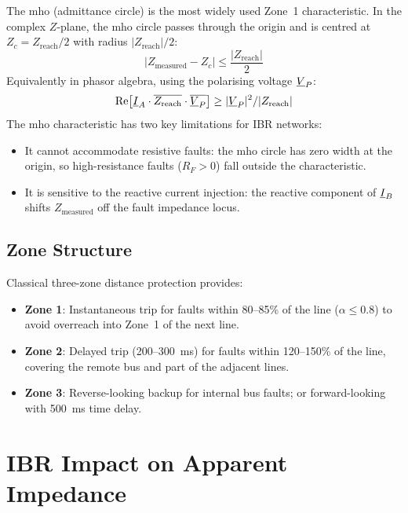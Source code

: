 The mho (admittance circle) is the most widely used Zone~1 characteristic.
In the complex $Z$-plane, the mho circle passes through the origin and
is centred at $Z_c = Z_\mathrm{reach}/2$ with radius $|Z_\mathrm{reach}|/2$:
\begin{equation}
  |Z_\mathrm{measured} - Z_c| \leq \frac{|Z_\mathrm{reach}|}{2}
  \label{eq:ch5_mho}
\end{equation}
Equivalently in phasor algebra, using the polarising voltage $\underline{V}_P$:
\begin{equation}
  \mathrm{Re}\!\left[\underline{I}_A \cdot \overline{Z_\mathrm{reach}} \cdot
    \overline{\underline{V}_P}\right] \geq |\underline{V}_P|^2 / |Z_\mathrm{reach}|
  \label{eq:ch5_mho_phasor}
\end{equation}
The mho characteristic has two key limitations for IBR networks:
\begin{itemize}
\item It cannot accommodate resistive faults: the mho circle has zero
      width at the origin, so high-resistance faults ($R_F > 0$) fall
      outside the characteristic.
\item It is sensitive to the reactive current injection: the reactive
      component of $\underline{I}_B$ shifts $Z_\mathrm{measured}$ off the
      fault impedance locus.
\end{itemize}

\subsection{Zone Structure}

Classical three-zone distance protection provides:
\begin{itemize}
\item \textbf{Zone 1}: Instantaneous trip for faults within 80--85\% of
      the line ($\alpha \leq 0.8$) to avoid overreach into Zone~1 of
      the next line.
\item \textbf{Zone 2}: Delayed trip (200--300~ms) for faults within
      120--150\% of the line, covering the remote bus and part of
      the adjacent lines.
\item \textbf{Zone 3}: Reverse-looking backup for internal bus faults;
      or forward-looking with 500~ms time delay.
\end{itemize}

\section{IBR Impact on Apparent Impedance}
\label{sec:ch5_ibr_impact}

